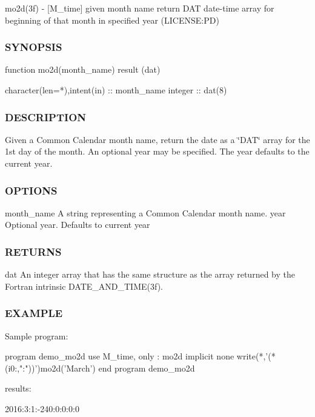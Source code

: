 mo2d(3f) -\/ \mbox{[}M\+\_\+time\mbox{]} given month name return D\+AT date-\/time array for beginning of that month in specified year (L\+I\+C\+E\+N\+SE\+:PD) 

\subsubsection*{S\+Y\+N\+O\+P\+S\+IS}

\begin{DoxyVerb}   function mo2d(month_name) result (dat)

    character(len=*),intent(in) :: month_name
    integer                     :: dat(8)
\end{DoxyVerb}


\subsubsection*{D\+E\+S\+C\+R\+I\+P\+T\+I\+ON}

Given a Common Calendar month name, return the date as a \char`\"{}\+D\+A\+T\char`\"{} array for the 1st day of the month. An optional year may be specified. The year defaults to the current year.

\subsubsection*{O\+P\+T\+I\+O\+NS}

month\+\_\+name A string representing a Common Calendar month name. year Optional year. Defaults to current year \subsubsection*{R\+E\+T\+U\+R\+NS}

dat An integer array that has the same structure as the array returned by the Fortran intrinsic D\+A\+T\+E\+\_\+\+A\+N\+D\+\_\+\+T\+I\+M\+E(3f).

\subsubsection*{E\+X\+A\+M\+P\+LE}

\begin{DoxyVerb}Sample program:

 program demo_mo2d
 use M_time, only : mo2d
 implicit none
    write(*,'(*(i0:,":"))')mo2d('March')
 end program demo_mo2d

results:

   2016:3:1:-240:0:0:0:0
\end{DoxyVerb}


